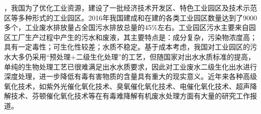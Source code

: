，我国为了优化工业资源，建设了一批经济技术开发区、特色工业园区及技术示范区等多种形式的工业园区。2016年我国建成和在建的各类工业园区数量达到了9000多个，工业废水排放量占全国污水排放总量的45\%左右。工业园区污水主要来自园区工厂生产过程中产生的污水和废液，其主要特点是：成分复杂，污染物浓度高；具有一定毒性；可生化性较差；水质不稳定。基于成本考虑，我国对工业园区的污水大多仍采用“预处理+二级生化处理”的工艺，但随国家对出水水质标准的提高，单纯的生物处理工艺已很难满足出水水质要求，因此对工业废水二级生化出水进行深度处理，进一步降低有毒有害物质的含量具有重大的现实意义。近年来各种高级氧化技术，如紫外光催化氧化技术、臭氧催化氧化技术、电催化氧化技术、超声降解技术、芬顿催化氧化技术等在有毒难降解有机废水处理方面有大量的研究工作报道。\par